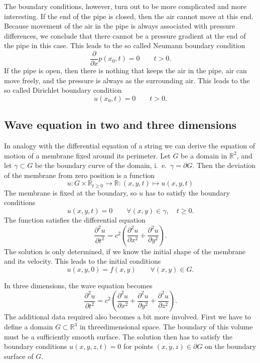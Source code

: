 The boundary conditions, however, turn out to be more complicated and more
interesting.
If the end of the pipe is closed, then the air cannot move at this end.
Because movement of the air in the pipe is always associated with pressure
differences, we conclude that there cannot be a pressure gradient at the
end of the pipe in this case.
This leads to the so called Neumann boundary condition
\[
\frac{\partial}{\partial x}p(x_0,t) = 0\qquad t>0.
\]
If the pipe is open, then there is nothing that keeps the air in the pipe,
air can move freely, and the pressure is always as the surrounding air.
This leads to the so called Dirichlet boundary condition
\[
u(x_0,t)=0\qquad t>0.
\]

\subsection{Wave equation in two and three dimensions}
In analogy with the differential equation of a string we can derive the
equation of motion of a membrane fixed around its perimeter.
Let $G$ be a domain in $\mathbb R^2$, and let $\gamma\subset G$ be
the boundary curve of the domain, i.~e.~$\gamma = \partial G$.
Then the deviation of the membrane from zero position is a function
\[
 u \colon G\times \mathbb R_{t \ge 0}\to\mathbb R\colon (x,y,t)\mapsto  u (x,y,t)
\]
The membrane is fixed at the boundary, so $u$ has to satisfy the
boundary conditions
\[
 u (x,y,t)=0\qquad \forall (x,y)\in\gamma,\quad t\ge 0.
\]
The function satisfies the differential equation
\[
\frac{\partial^2 u }{\partial t^2}
=
c^2\left(\frac{\partial^2 u }{\partial x^2}
+
\frac{\partial^2 u }{\partial y^2}\right).
\]
The solution is only determined, if we know the initial shape of the
membrane and its velocity. 
This leads to the initial conditions
\[
 u (x,y,0)=f(x,y)\qquad \forall (x,y)\in G.
\]

In three dimensions, the wave equation becomes
\[
\frac{\partial^2 u }{\partial t^2}
=c^2\left(\frac{\partial^2 u }{\partial x^2}
+\frac{\partial^2 u }{\partial y^2}
+\frac{\partial^2 u }{\partial z^2}
\right).
\]
The additional data required also becomes a bit more involved.
First we have to define a domain 
$G\subset \mathbb R^3$ in threedimensional space.
The boundary of this volume must be a sufficiently smooth surface.
The solution then has to satisfy the boundary conditions
$u(x,y,z,t) = 0$ for points
$(x,y,z)\in \partial G$ on the boundary surface of $G$.

